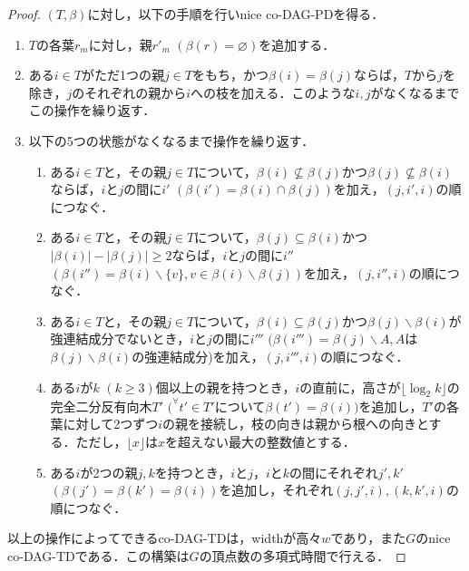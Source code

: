 \documentclass[master]{kuisthesis}		%
\theoremstyle{plain}
\theoremstyle{definition}
\begin{document}
\begin{proof}
    $(T, \beta)$に対し，以下の手順を行いnice co-DAG-PDを得る．

    \begin{enumerate}
        \item $T$の各葉$r_m$に対し，親$r'_m$ $(\beta(r) = \varnothing)$を追加する．
        \item ある$i \in T$がただ1つの親$j \in T$をもち，かつ$\beta(i) = \beta(j)$ならば，$T$から$j$を除き，$j$のそれぞれの親から$i$への枝を加える．このような$i, j$がなくなるまでこの操作を繰り返す．
        \item 以下の5つの状態がなくなるまで操作を繰り返す．
        \begin{enumerate}
            \item ある$i \in T$と，その親$j \in T$について，$\beta(i) \nsubseteq \beta(j)$かつ$\beta(j) \nsubseteq \beta(i)$ならば，$i$と$j$の間に$i'$ $(\beta(i') = \beta(i) \cap \beta(j))$を加え，$(j, i', i)$の順につなぐ．
            \item ある$i \in T$と，その親$j \in T$について，$\beta(j) \subseteq \beta(i)$かつ$|\beta(i)| - |\beta(j)| \geq 2$ならば，$i$と$j$の間に$i''$ $(\beta(i'') = \beta(i) \backslash \{v\}, v \in \beta(i) \backslash \beta(j))$を加え，$(j, i'', i)$の順につなぐ．
            \item ある$i \in T$と，その親$j \in T$について，$\beta(i) \subseteq \beta(j)$かつ$\beta(j) \backslash \beta(i)$が強連結成分でないとき，$i$と$j$の間に$i'''$ $(\beta(i''') = \beta(j) \backslash A, A$は$\beta(j) \backslash \beta(i)$の強連結成分)を加え，$(j, i''', i)$の順につなぐ．
            \item ある$i$が$k$ $(k \geq 3)$個以上の親を持つとき，$i$の直前に，高さが$\lfloor \log_{2} k \rfloor$の完全二分反有向木$T'$ $(^{\forall}t' \in T'$について$\beta(t') = \beta(i))$を追加し，$T'$の各葉に対して2つずつ$i$の親を接続し，枝の向きは親から根への向きとする．ただし，$\lfloor x \rfloor$は$x$を超えない最大の整数値とする．
            \item ある$i$が2つの親$j, k$を持つとき，$i$と$j$，$i$と$k$の間にそれぞれ$j', k'$ $(\beta(j') = \beta(k') = \beta(i))$を追加し，それぞれ$(j, j', i), (k, k', i)$の順につなぐ．
        \end{enumerate}
    \end{enumerate}

    以上の操作によってできるco-DAG-TDは，widthが高々$w$であり，また$G$のnice co-DAG-TDである．この構築は$G$の頂点数の多項式時間で行える．
\end{proof}
\end{document}
